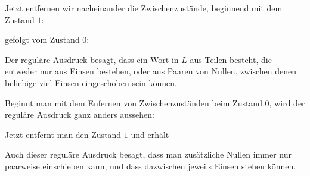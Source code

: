 \begin{loesung}
\begin{center}
\end{center}
Jetzt entfernen wir nacheinander die Zwischenzustände, beginnend mit dem
Zustand $1$:
\begin{center}
\end{center}
gefolgt vom Zustand $0$:
\begin{center}
\end{center}
Der reguläre Ausdruck besagt, dass ein Wort in $L$ aus Teilen besteht, die
entweder nur aus Einsen bestehen, oder aus Paaren von Nullen, zwischen
denen beliebige viel Einsen eingeschoben sein können.

Beginnt man mit dem Enfernen von Zwischenzuständen beim Zustand $0$, wird 
der reguläre Ausdruck ganz anders aussehen:
\begin{center}
\end{center}
Jetzt entfernt man den Zustand $1$ und erhält
\begin{center}
\end{center}
Auch dieser reguläre Ausdruck besagt, dass man zusätzliche Nullen immer
nur paarweise einschieben kann, und dass dazwischen jeweils Einsen stehen
können.
\end{loesung}

